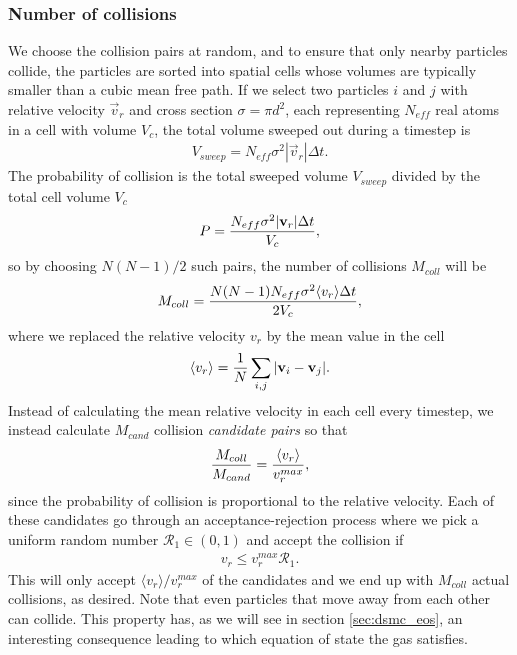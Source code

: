 \subsubsection{Number of collisions}
We choose the collision pairs at random, and to ensure that only nearby particles collide, the particles are sorted into spatial cells whose volumes are typically smaller than a cubic mean free path. If we select two particles $i$ and $j$ with relative velocity $\vec v_r$ and cross section $\sigma=\pi d^2$, each representing $N_{eff}$ real atoms in a cell with volume $V_c$, the total volume sweeped out during a timestep is
\begin{align}
	V_{sweep} = N_{eff}\sigma^2|\vec v_r|\Delta t.
\end{align}
The probability of collision is the total sweeped volume $V_{sweep}$ divided by the total cell volume $V_c$
\begin{align}
	P = {N_{eff}\sigma^2|\vec v_r|\Delta t \over V_c},
\end{align}
so by choosing $N(N-1)/2$ such pairs, the number of collisions $M_{coll}$ will be
\begin{align}
	M_{coll} = {N(N-1)N_{eff}\sigma^2\langle v_r \rangle \Delta t\over 2 V_c},
\end{align}
where we replaced the relative velocity $v_r$ by the mean value in the cell
\begin{align}
	\langle v_r \rangle = {1\over N} \sum_{i,j} |\vec v_i - \vec v_j|.
\end{align}
Instead of calculating the mean relative velocity in each cell every timestep, we instead calculate $M_{cand}$ collision \textit{candidate pairs} so that
\begin{align}
	{M_{coll}\over M_{cand}} = {\langle v_r\rangle \over v_r^{max}},
\end{align}
since the probability of collision is proportional to the relative velocity. Each of these candidates go through an acceptance-rejection process where we pick a uniform random number $\mathcal{R}_1\in (0,1)$ and accept the collision if
\begin{align}
	v_r \leq v_r^{max}\mathcal{R}_1.
\end{align}
This will only accept $\langle v_r\rangle/v_r^{max}$ of the candidates and we end up with $M_{coll}$ actual collisions, as desired. Note that even particles that move away from each other can collide. This property has, as we will see in section \ref{sec:dsmc_eos}, an interesting consequence leading to which equation of state the gas satisfies.
